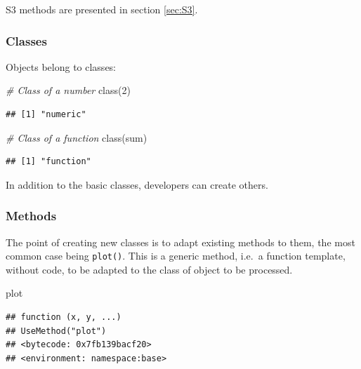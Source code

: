 \documentclass[
  12pt,
  american,
  a4paper,
  extrafontsizes,onecolumn,openright
  ]{memoir}
\newenvironment{Shaded}{\begin{snugshade}}{\end{snugshade}}
\newcommand{\CommentTok}[1]{\textcolor[rgb]{0.56,0.35,0.01}{\textit{#1}}}
\newcommand{\DecValTok}[1]{\textcolor[rgb]{0.00,0.00,0.81}{#1}}
\newcommand{\FunctionTok}[1]{\textcolor[rgb]{0.00,0.00,0.00}{#1}}
\newcommand{\NormalTok}[1]{#1}
\begin{document}
S3 methods are presented in section \ref{sec:S3}.

\hypertarget{classes}{%
\subsubsection{Classes}\label{classes}}

Objects belong to classes:

\scriptsize

\begin{Shaded}
\begin{Highlighting}[]
\CommentTok{\# Class of a number}
\FunctionTok{class}\NormalTok{(}\DecValTok{2}\NormalTok{)}
\end{Highlighting}
\end{Shaded}

\begin{verbatim}
## [1] "numeric"
\end{verbatim}

\begin{Shaded}
\begin{Highlighting}[]
\CommentTok{\# Class of a function}
\FunctionTok{class}\NormalTok{(sum)}
\end{Highlighting}
\end{Shaded}

\begin{verbatim}
## [1] "function"
\end{verbatim}

\normalsize

In addition to the basic classes, developers can create others.

\hypertarget{methods}{%
\subsubsection{Methods}\label{methods}}

The point of creating new classes is to adapt existing methods to them, the most common case being \texttt{plot()}.
This is a generic method, i.e.~a function template, without code, to be adapted to the class of object to be processed.

\scriptsize

\begin{Shaded}
\begin{Highlighting}[]
\NormalTok{plot}
\end{Highlighting}
\end{Shaded}

\begin{verbatim}
## function (x, y, ...) 
## UseMethod("plot")
## <bytecode: 0x7fb139bacf20>
## <environment: namespace:base>
\end{verbatim}
\end{document}
